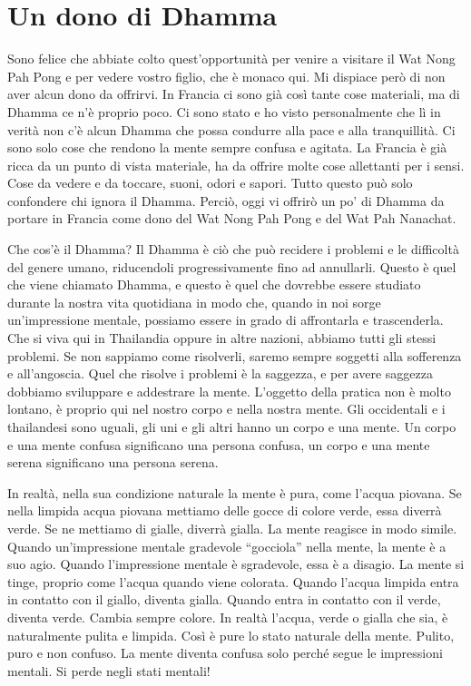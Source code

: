 \chapter{Un dono di Dhamma}

Sono felice che abbiate colto quest'opportunità per venire a visitare il
Wat Nong Pah Pong e per vedere vostro figlio, che è monaco qui. Mi
dispiace però di non aver alcun dono da offrirvi. In Francia ci sono già
così tante cose materiali, ma di Dhamma ce n'è proprio poco. Ci sono
stato e ho visto personalmente che lì in verità non c'è alcun Dhamma che
possa condurre alla pace e alla tranquillità. Ci sono solo cose che
rendono la mente sempre confusa e agitata. La Francia è già ricca da un
punto di vista materiale, ha da offrire molte cose allettanti per i
sensi. Cose da vedere e da toccare, suoni, odori e sapori. Tutto questo
può solo confondere chi ignora il Dhamma. Perciò, oggi vi offrirò un po'
di Dhamma da portare in Francia come dono del Wat Nong Pah Pong e del
Wat Pah Nanachat.

Che cos'è il Dhamma? Il Dhamma è ciò che può recidere i problemi e le
difficoltà del genere umano, riducendoli progressivamente fino ad
annullarli. Questo è quel che viene chiamato Dhamma, e questo è quel che
dovrebbe essere studiato durante la nostra vita quotidiana in modo che,
quando in noi sorge un'impressione mentale, possiamo essere in grado di
affrontarla e trascenderla. Che si viva qui in Thailandia oppure in
altre nazioni, abbiamo tutti gli stessi problemi. Se non sappiamo come
risolverli, saremo sempre soggetti alla sofferenza e all'angoscia. Quel
che risolve i problemi è la saggezza, e per avere saggezza dobbiamo
sviluppare e addestrare la mente. L'oggetto della pratica non è molto
lontano, è proprio qui nel nostro corpo e nella nostra mente. Gli
occidentali e i thailandesi sono uguali, gli uni e gli altri hanno un
corpo e una mente. Un corpo e una mente confusa significano una persona
confusa, un corpo e una mente serena significano una persona serena.

In realtà, nella sua condizione naturale la mente è pura, come l'acqua
piovana. Se nella limpida acqua piovana mettiamo delle gocce di colore
verde, essa diverrà verde. Se ne mettiamo di gialle, diverrà gialla. La
mente reagisce in modo simile. Quando un'impressione mentale gradevole
``gocciola'' nella mente, la mente è a suo agio. Quando l'impressione
mentale è sgradevole, essa è a disagio. La mente si tinge, proprio come
l'acqua quando viene colorata. Quando l'acqua limpida entra in contatto
con il giallo, diventa gialla. Quando entra in contatto con il verde,
diventa verde. Cambia sempre colore. In realtà l'acqua, verde o gialla
che sia, è naturalmente pulita e limpida. Così è pure lo stato naturale
della mente. Pulito, puro e non confuso. La mente diventa confusa solo
perché segue le impressioni mentali. Si perde negli stati mentali!

